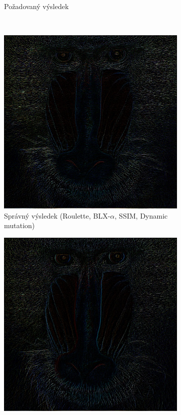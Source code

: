 \documentclass[a4paper,11pt]{scrartcl}
\begin{document}
\begin{figure}[!h]
\begin{subfigure}[b]{0.32\textwidth}
        \caption{Požadovaný výsledek}
        \label{fig:gull}
    \end{subfigure}
    \\
    \begin{subfigure}[b]{0.32\textwidth}
        \includegraphics[width=\textwidth]{img/roulette-blx_a-ssim-dynamic_example1.jpg}
        \caption{Správný výsledek (Roulette, BLX-$\alpha$, SSIM, Dynamic mutation)}
        \label{fig:ex11}
    \end{subfigure}
    \begin{subfigure}[b]{0.32\textwidth}
        \includegraphics[width=\textwidth]{img/ranksel-simple-ssim-dynamic_example1.jpg}

\end{subfigure}
\end{figure}
\end{document}
